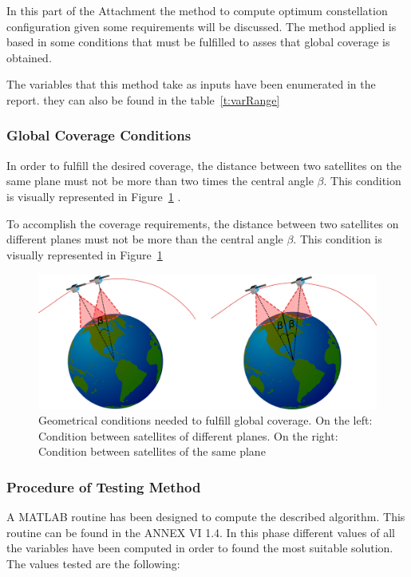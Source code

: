 In this part of the Attachment the method to compute optimum constellation configuration given some requirements will be discussed. The method applied is based in some conditions that must be fulfilled to asses that global coverage is obtained.

The variables that this method take as inputs have been enumerated in the report. they can also be found in the table~\ref{t:varRange}

\subsubsection{Global Coverage Conditions}

In order to fulfill the desired coverage, the distance between two satellites on the same plane must not be more than two times the central angle $\beta$. This condition is visually represented in Figure~\ref{fig:ConditionGCoverage} .

To accomplish the coverage requirements, the distance between two satellites on different planes must not be more than the central angle $\beta$. This condition is visually represented in Figure~\ref{fig:ConditionGCoverage} 

\begin{figure}[H] %
	\centering
	\includegraphics[width=.8\textwidth]{./testing/ConditionGCoverage.png}
	\caption[Geometrical conditions needed to fulfill global coverage]{Geometrical conditions needed to fulfill global coverage. On the left: Condition between satellites of different planes. On the right: Condition between satellites of the same plane}
	\label{fig:ConditionGCoverage}
\end{figure}

\subsubsection{Procedure of Testing Method}
A MATLAB routine has been designed to compute the described algorithm. This routine can be found in the ANNEX VI 1.4. In this phase different values of all the variables have been computed in order to found the most suitable solution. The values tested are the following:

